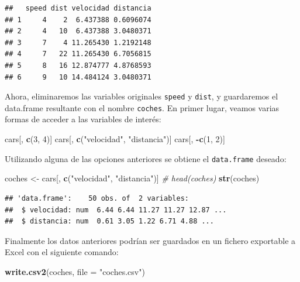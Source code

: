 \documentclass[
]{book}
\newenvironment{Shaded}{\begin{snugshade}}{\end{snugshade}}
\newcommand{\AttributeTok}[1]{\textcolor[rgb]{0.13,0.29,0.53}{#1}}
\newcommand{\CommentTok}[1]{\textcolor[rgb]{0.56,0.35,0.01}{\textit{#1}}}
\newcommand{\DecValTok}[1]{\textcolor[rgb]{0.00,0.00,0.81}{#1}}
\newcommand{\FunctionTok}[1]{\textcolor[rgb]{0.13,0.29,0.53}{\textbf{#1}}}
\newcommand{\NormalTok}[1]{#1}
\newcommand{\OtherTok}[1]{\textcolor[rgb]{0.56,0.35,0.01}{#1}}
\newcommand{\SpecialCharTok}[1]{\textcolor[rgb]{0.81,0.36,0.00}{\textbf{#1}}}
\newcommand{\StringTok}[1]{\textcolor[rgb]{0.31,0.60,0.02}{#1}}
\begin{document}
\begin{verbatim}
##   speed dist velocidad distancia
## 1     4    2  6.437388 0.6096074
## 2     4   10  6.437388 3.0480371
## 3     7    4 11.265430 1.2192148
## 4     7   22 11.265430 6.7056815
## 5     8   16 12.874777 4.8768593
## 6     9   10 14.484124 3.0480371
\end{verbatim}

Ahora, eliminaremos las variables originales \texttt{speed} y
\texttt{dist}, y guardaremos el data.frame resultante con el nombre \texttt{coches}.
En primer lugar, veamos varias formas de acceder a las variables de
interés:

\begin{Shaded}
\begin{Highlighting}[]
\NormalTok{cars[, }\FunctionTok{c}\NormalTok{(}\DecValTok{3}\NormalTok{, }\DecValTok{4}\NormalTok{)]}
\NormalTok{cars[, }\FunctionTok{c}\NormalTok{(}\StringTok{"velocidad"}\NormalTok{, }\StringTok{"distancia"}\NormalTok{)]}
\NormalTok{cars[, }\SpecialCharTok{{-}}\FunctionTok{c}\NormalTok{(}\DecValTok{1}\NormalTok{, }\DecValTok{2}\NormalTok{)]}
\end{Highlighting}
\end{Shaded}

Utilizando alguna de las opciones anteriores se obtiene el \texttt{data.frame}
deseado:

\begin{Shaded}
\begin{Highlighting}[]
\NormalTok{coches }\OtherTok{\textless{}{-}}\NormalTok{ cars[, }\FunctionTok{c}\NormalTok{(}\StringTok{"velocidad"}\NormalTok{, }\StringTok{"distancia"}\NormalTok{)]}
\CommentTok{\# head(coches)}
\FunctionTok{str}\NormalTok{(coches)}
\end{Highlighting}
\end{Shaded}

\begin{verbatim}
## 'data.frame':    50 obs. of  2 variables:
##  $ velocidad: num  6.44 6.44 11.27 11.27 12.87 ...
##  $ distancia: num  0.61 3.05 1.22 6.71 4.88 ...
\end{verbatim}

Finalmente los datos anteriores podrían ser guardados en un fichero
exportable a Excel con el siguiente comando:

\begin{Shaded}
\begin{Highlighting}[]
\FunctionTok{write.csv2}\NormalTok{(coches, }\AttributeTok{file =} \StringTok{"coches.csv"}\NormalTok{)}
\end{Highlighting}
\end{Shaded}
\end{document}
